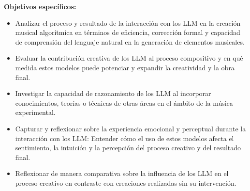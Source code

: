 \textbf{Objetivos específicos:}
\begin{itemize}
    \item Analizar el proceso y resultado de la interacción con los LLM en la creación musical algorítmica en términos de eficiencia, corrección formal y capacidad de comprensión del lenguaje natural en la generación de elementos musicales.
    \item Evaluar la contribución creativa de los LLM al proceso compositivo y en qué medida estos modelos puede potenciar y expandir la creatividad y la obra final.
    \item Investigar la capacidad de razonamiento de los LLM al incorporar conocimientos, teorías o técnicas de otras áreas en el ámbito de la música experimental.
    \item Capturar y reflexionar sobre la experiencia emocional y perceptual durante la interacción con los LLM: Entender cómo el uso de estos modelos afecta el sentimiento, la intuición y la percepción del proceso creativo y del resultado final.
    \item Reflexionar de manera comparativa sobre la influencia de los LLM en el proceso creativo en contraste con creaciones realizadas sin su intervención.
\end{itemize}
